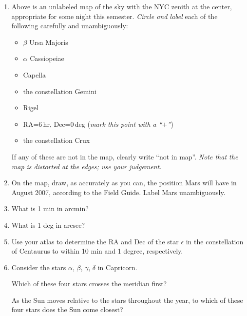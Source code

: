 \documentclass[12pt]{article}
\begin{document}
\begin{enumerate}

\item
Above is an unlabeled map of the sky with the NYC zenith at the
center, appropriate for some night this semester.  \emph{Circle and
label} each of the following carefully and unambiguously:
\begin{itemize}
\item $\beta$ Ursa Majoris
\item $\alpha$ Cassiopeiae
\item Capella
\item the constellation Gemini
\item Rigel
\item RA=6\,hr, Dec=0\,deg (\emph{mark this point with a ``$+$''})
\item the constellation Crux
\end{itemize}
If any of these are not in the map, clearly write ``not in map''.
\emph{Note that the map is distorted at the edges; use your
judgement.}

\item
On the map, draw, as accurately as you can, the position Mars will
have in August 2007, according to the Field Guide.  Label Mars
unambiguously.

\item 
What is 1 min in arcmin?

\vspace{0.5in}

\item 
What is 1 deg in arcsec?

\vspace{0.5in}

\item 
Use your atlas to determine the RA and Dec of the star $\epsilon$ in
the constellation of Centaurus to within 10 min and 1 degree,
respectively.

\vspace{0.5in}

\item
Consider the stars $\alpha$, $\beta$, $\gamma$, $\delta$ in Capricorn.

Which of these four stars crosses the meridian first?

\vspace{0.5in}

As the Sun moves relative to the stars throughout the year, to which
of these four stars does the Sun come closest?

\vspace{0.5in}


\end{enumerate}
\end{document}
